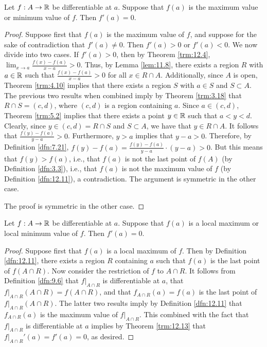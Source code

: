 \documentclass[../main.tex]{subfiles}
\begin{document}
\begin{theorem}\label{trm:12.13}
    Let $f:A\to\mathbb{R}$ be differentiable at $a$. Suppose that $f(a)$ is the maximum value or minimum value of $f$. Then $f'(a)=0$.
    \begin{proof}
        Suppose first that $f(a)$ is the maximum value of $f$, and suppose for the sake of contradiction that $f'(a)\neq 0$. Then $f'(a)>0$ or $f'(a)<0$. We now divide into two cases. If $f'(a)>0$, then by Theorem \ref{trm:12.4}, $\lim_{x\to a}\frac{f(x)-f(a)}{x-a}>0$. Thus, by Lemma \ref{lem:11.8}, there exists a region $R$ with $a\in\mathbb{R}$ such that $\frac{f(x)-f(a)}{x-a}>0$ for all $x\in R\cap A$. Additionally, since $A$ is open, Theorem \ref{trm:4.10} implies that there exists a region $S$ with $a\in S$ and $S\subset A$. The previous two results when combined imply by Theorem \ref{trm:3.18} that $R\cap S=(c,d)$, where $(c,d)$ is a region containing $a$. Since $a\in(c,d)$, Theorem \ref{trm:5.2} implies that there exists a point $y\in\mathbb{R}$ such that $a<y<d$. Clearly, since $y\in(c,d)=R\cap S$ and $S\subset A$, we have that $y\in R\cap A$. It follows that $\frac{f(y)-f(a)}{y-a}>0$. Furthermore, $y>a$ implies that $y-a>0$. Therefore, by Definition \ref{dfn:7.21}, $f(y)-f(a)=\frac{f(y)-f(a)}{y-a}\cdot(y-a)>0$. But this means that $f(y)>f(a)$, i.e., that $f(a)$ is not the last point of $f(A)$ (by Definition \ref{dfn:3.3}), i.e., that $f(a)$ is not the maximum value of $f$ (by Definition \ref{dfn:12.11}), a contradiction. The argument is symmetric in the other case.\par
        The proof is symmetric in the other case.
    \end{proof}
\end{theorem}

\begin{corollary}\label{cly:12.14}
    Let $f:A\to\mathbb{R}$ be differentiable at $a$. Suppose that $f(a)$ is a local maximum or local minimum value of $f$. Then $f'(a)=0$.
    \begin{proof}
        Suppose first that $f(a)$ is a local maximum of $f$. Then by Definition \ref{dfn:12.11}, there exists a region $R$ containing $a$ such that $f(a)$ is the last point of $f(A\cap R)$. Now consider the restriction of $f$ to $A\cap R$. It follows from Definition \ref{dfn:9.6} that $f|_{A\cap R}$ is differentiable at $a$, that $f|_{A\cap R}(A\cap R)=f(A\cap R)$, and that $f_{A\cap R}(a)=f(a)$ is the last point of $f|_{A\cap R}(A\cap R)$. The latter two results imply by Definition \ref{dfn:12.11} that $f_{A\cap R}(a)$ is the maximum value of $f|_{A\cap R}$. This combined with the fact that $f|_{A\cap R}$ is differentiable at $a$ implies by Theorem \ref{trm:12.13} that $f|_{A\cap R}'(a)=f'(a)=0$, as desired.
    \end{proof}
\end{corollary}
\end{document}
